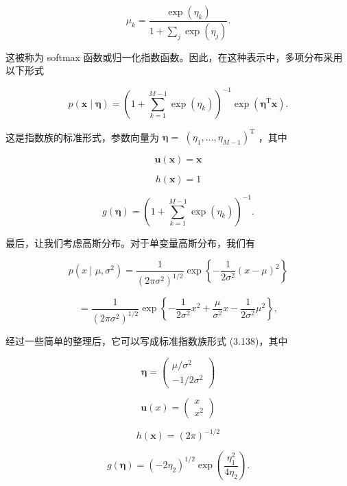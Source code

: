 \documentclass[10pt]{article}
\begin{document}
\[
{\mu }_{k} = \frac{\exp \left( {\eta }_{k}\right) }{1 + \mathop{\sum }\limits_{j}\exp \left( {\eta }_{j}\right) }. \tag{3.157}
\]

这被称为 softmax 函数或归一化指数函数。因此，在这种表示中，多项分布采用以下形式

\[
p\left( {\mathbf{x} \mid  \mathbf{\eta }}\right)  = {\left( 1 + \mathop{\sum }\limits_{{k = 1}}^{{M - 1}}\exp \left( {\eta }_{k}\right) \right) }^{-1}\exp \left( {{\mathbf{\eta }}^{\mathrm{T}}\mathbf{x}}\right) . \tag{3.158}
\]

这是指数族的标准形式，参数向量为 \(\mathbf{\eta } =\)  \({\left( {\eta }_{1},\ldots ,{\eta }_{M - 1}\right) }^{\mathrm{T}}\) ，其中

\[
\mathbf{u}\left( \mathbf{x}\right)  = \mathbf{x} \tag{3.159}
\]

\[
h\left( \mathbf{x}\right)  = 1 \tag{3.160}
\]

\[
g\left( \mathbf{\eta }\right)  = {\left( 1 + \mathop{\sum }\limits_{{k = 1}}^{{M - 1}}\exp \left( {\eta }_{k}\right) \right) }^{-1}. \tag{3.161}
\]

最后，让我们考虑高斯分布。对于单变量高斯分布，我们有

\[
p\left( {x \mid  \mu ,{\sigma }^{2}}\right)  = \frac{1}{{\left( 2\pi {\sigma }^{2}\right) }^{1/2}}\exp \left\{  {-\frac{1}{2{\sigma }^{2}}{\left( x - \mu \right) }^{2}}\right\}   \tag{3.162}
\]

\[
= \frac{1}{{\left( 2\pi {\sigma }^{2}\right) }^{1/2}}\exp \left\{  {-\frac{1}{2{\sigma }^{2}}{x}^{2} + \frac{\mu }{{\sigma }^{2}}x - \frac{1}{2{\sigma }^{2}}{\mu }^{2}}\right\}  , \tag{3.163}
\]

经过一些简单的整理后，它可以写成标准指数族形式 (3.138)，其中

\[
\mathbf{\eta } = \left( \begin{matrix} \mu /{\sigma }^{2} \\   - 1/2{\sigma }^{2} \end{matrix}\right)  \tag{3.164}
\]

\[
\mathbf{u}\left( x\right)  = \left( \begin{matrix} x \\  {x}^{2} \end{matrix}\right)  \tag{3.165}
\]

\[
h\left( \mathbf{x}\right)  = {\left( 2\pi \right) }^{-1/2} \tag{3.166}
\]

\[
g\left( \mathbf{\eta }\right)  = {\left( -2{\eta }_{2}\right) }^{1/2}\exp \left( \frac{{\eta }_{1}^{2}}{4{\eta }_{2}}\right) . \tag{3.167}
\]
\end{document}
